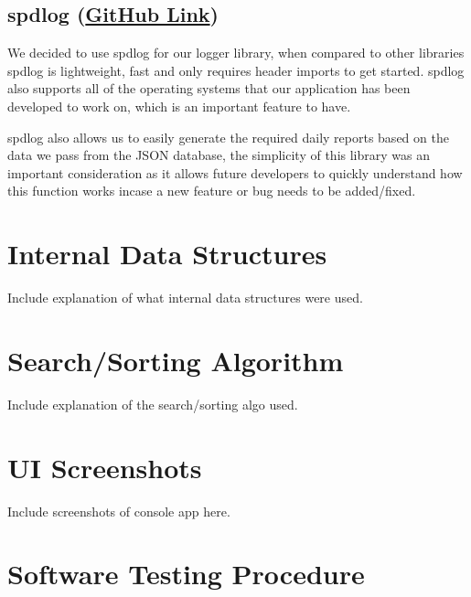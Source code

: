 \documentclass[
  english,
  a4paper,
,tablecaptionabove
]{scrartcl}
\begin{document}
\hypertarget{spdlog-github-link}{%
\subsection{\texorpdfstring{spdlog
(\href{https://github.com/gabime/spdlog}{GitHub
Link})}{spdlog (GitHub Link)}}\label{spdlog-github-link}}

We decided to use spdlog for our logger library, when compared to other
libraries spdlog is lightweight, fast and only requires header imports
to get started. spdlog also supports all of the operating systems that
our application has been developed to work on, which is an important
feature to have.

spdlog also allows us to easily generate the required daily reports
based on the data we pass from the JSON database, the simplicity of this
library was an important consideration as it allows future developers to
quickly understand how this function works incase a new feature or bug
needs to be added/fixed.

\newpage

\hypertarget{internal-data-structures}{%
\section{Internal Data Structures}\label{internal-data-structures}}

Include explanation of what internal data structures were used.

\newpage

\hypertarget{searchsorting-algorithm}{%
\section{Search/Sorting Algorithm}\label{searchsorting-algorithm}}

Include explanation of the search/sorting algo used.

\newpage

\hypertarget{ui-screenshots}{%
\section{UI Screenshots}\label{ui-screenshots}}

Include screenshots of console app here.

\newpage

\hypertarget{software-testing-procedure}{%
\section{Software Testing Procedure}\label{software-testing-procedure}}
\end{document}
